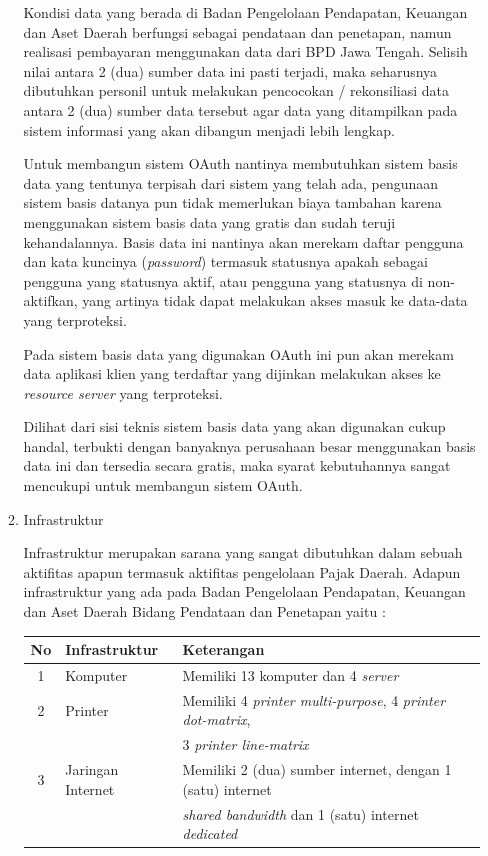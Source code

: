 \documentclass[pdftex,12pt, oneside]{article}
\begin{document}
\begin{enumerate}
\begin{enumerate}
Kondisi data yang berada di Badan Pengelolaan Pendapatan, Keuangan dan Aset Daerah berfungsi sebagai pendataan dan penetapan, namun realisasi pembayaran menggunakan data dari BPD Jawa Tengah. Selisih nilai antara 2 (dua) sumber data ini pasti terjadi, maka seharusnya dibutuhkan personil untuk melakukan pencocokan / rekonsiliasi data antara 2 (dua) sumber data tersebut agar data yang ditampilkan pada sistem informasi yang akan dibangun menjadi lebih lengkap.

Untuk membangun sistem OAuth nantinya membutuhkan sistem basis data yang tentunya terpisah dari sistem yang telah ada, pengunaan sistem basis datanya pun tidak memerlukan biaya tambahan karena menggunakan sistem basis data yang gratis dan sudah teruji kehandalannya. Basis data ini nantinya akan merekam daftar pengguna dan kata kuncinya (\textit{password}) termasuk statusnya apakah sebagai pengguna yang statusnya aktif, atau pengguna yang statusnya di non-aktifkan, yang artinya tidak dapat melakukan akses masuk ke data-data yang terproteksi.

Pada sistem basis data yang digunakan OAuth ini pun akan merekam data aplikasi klien yang terdaftar yang dijinkan melakukan akses ke \textit{resource server} yang terproteksi.

Dilihat dari sisi teknis sistem basis data yang akan digunakan cukup handal, terbukti dengan banyaknya perusahaan besar menggunakan basis data ini dan tersedia secara gratis, maka syarat kebutuhannya sangat mencukupi untuk membangun sistem OAuth.

	\item Infrastruktur
	
Infrastruktur merupakan sarana yang sangat dibutuhkan dalam sebuah aktifitas apapun termasuk aktifitas pengelolaan Pajak Daerah. Adapun infrastruktur yang ada pada Badan Pengelolaan Pendapatan, Keuangan dan Aset Daerah Bidang Pendataan dan Penetapan yaitu :

\begin{table}[H]
	\centering
	\begin{tabular}{| c | l | l |}
		\hline 
		No & Infrastruktur & Keterangan \\
		\hline
		1 & Komputer & Memiliki 13 komputer dan 4 \textit{server} \\
		\hline
		2 & Printer & Memiliki 4 \textit{printer multi-purpose}, 4 \textit{printer dot-matrix}, \\
		& & 3 \textit{printer line-matrix} \\
		\hline
		3 & Jaringan Internet & Memiliki 2 (dua) sumber internet, dengan 1 (satu) internet \\
		& & \textit{shared bandwidth} dan 1 (satu) internet \textit{dedicated} \\
		\hline
	\end{tabular}
\end{table}


\end{enumerate}
\end{enumerate}
\end{document}
